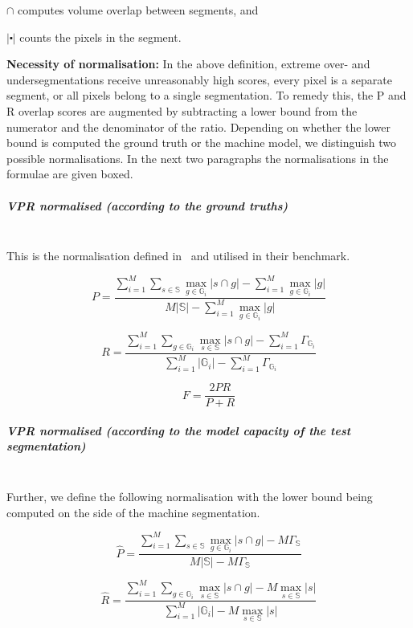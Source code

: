 $\cap$ computes volume overlap between segments, and 

$\left|\centerdot\right|$ counts the pixels in the segment.%

\textbf{Necessity of normalisation:} In the above definition, extreme over- and undersegmentations receive unreasonably high scores, \ie every pixel is a separate segment, or all pixels belong to a single segmentation. To remedy this, the P and R overlap scores are augmented by subtracting a lower bound from the numerator and the denominator of the ratio. Depending on whether the lower bound is computed \wrt the ground truth or the machine model, we distinguish two possible normalisations. In the next two paragraphs the normalisations in the formulae are given boxed.

\subparagraph*{VPR normalised (according to the ground truths)}\mbox{}\\ %
This is the normalisation defined in~\cite{Galasso13} and utilised %
in their benchmark.

\[
P=\frac{\sum\limits _{i=1}^{M}\sum\limits _{s\in\mathbb{S}}\max\limits _{g\in\mathbb{G}_{i}}\left|s\cap g\right|-\boxed{\sum\limits _{i=1}^{M}\max\limits _{g\in\mathbb{G}_{i}}\left|g\right|}}{M\left|\mathbb{S}\right|-\boxed{\sum\limits _{i=1}^{M}\max\limits _{g\in\mathbb{G}_{i}}\left|g\right|}}
\]

\[
R=\frac{\sum\limits _{i=1}^{M}\sum\limits _{g\in\mathbb{G}_{i}}\max\limits _{s\in\mathbb{S}}\left|s\cap g\right|-\boxed{\sum\limits _{i=1}^{M}\Gamma_{\mathbb{G}_{i}}}}{\sum\limits _{i=1}^{M}\left|\mathbb{G}_{i}\right|-\boxed{\sum\limits _{i=1}^{M}\Gamma_{\mathbb{G}_{i}}}}
\]

\[
F=\frac{2PR}{P+R}
\]

\subparagraph*{VPR normalised (according to the model capacity of the test segmentation)}\mbox{}\\ %
Further, we define the following normalisation with the lower bound being computed on the side of the machine segmentation.

\[
\hat{P}=\frac{\sum\limits _{i=1}^{M}\sum\limits _{s\in\mathbb{S}}\max\limits _{g\in\mathbb{G}_{i}}\left|s\cap g\right|-\boxed{M\Gamma_{\mathbb{S}}}}{M\left|\mathbb{S}\right|-\boxed{M\Gamma_{\mathbb{S}}}}
\]

\[
\hat{{R}}=\frac{\sum\limits _{i=1}^{M}\sum\limits _{g\in\mathbb{G}_{i}}\max\limits _{s\in\mathbb{S}}\left|s\cap g\right|-\boxed{M\max_{s\in\mathbb{S}}\left|s\right|}}{\sum\limits _{i=1}^{M}\left|\mathbb{G}_{i}\right|-\boxed{M\max_{s\in\mathbb{S}}\left|s\right|}}
\]

